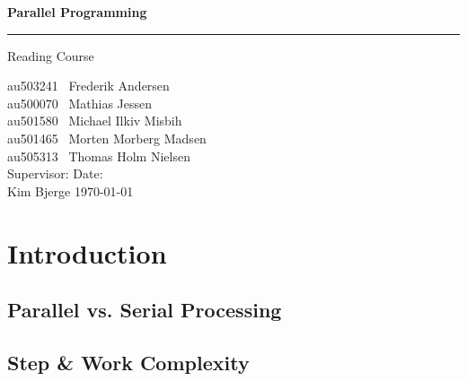 \documentclass[12px,oz]{report}
\theoremstyle{indented}
\begin{document}
	
	\begin{titlepage}
		\centering
		\vspace*{3\baselineskip}
		{\Huge \bfseries Parallel Programming}
		\rule{\linewidth}{0.5mm}
		\LARGE
		Reading Course
		\\
		\null\vfill
		\begin{flushleft} \large
			au503241 \hspace*{2em} \  Frederik Andersen\\
			au500070 \hspace*{2em} \  Mathias Jessen\\
			au501580 \hspace*{2em} \  Michael Ilkiv Misbih\\
			au501465 \hspace*{2em} \  Morten Morberg Madsen\\
			au505313 \hspace*{2em} \  Thomas Holm Nielsen\\
			\vspace{100pt}
			Supervisor:\hspace{94pt}  Date: \\
			Kim Bjerge \hspace{90pt}  \today\\
		\end{flushleft}
		\vspace*{6\baselineskip}
	\end{titlepage}

\tableofcontents
\clearpage
{}
\cleardoublepage

\chapter{Introduction}
\label{ch-intro}


	\section{Parallel vs. Serial Processing}
	\label{sec-par-vs-ser}
	

	\section{Step \& Work Complexity}
	\label{sec-step-comp}
	
\end{document}
